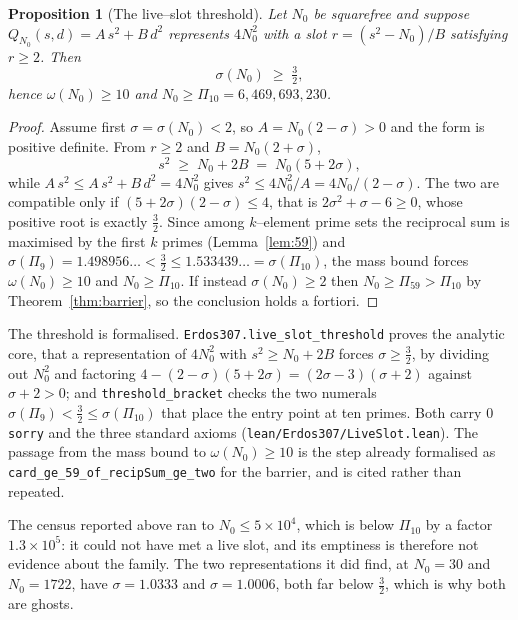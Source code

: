 \documentclass[11pt]{article}
\newtheorem{proposition}[theorem]{Proposition}
\theoremstyle{definition}
\begin{document}
\begin{proposition}[The live--slot threshold]\label{prop:liveslot}
Let $N_0$ be squarefree and suppose $Q_{N_0}(s,d)=A\,s^2+B\,d^2$ represents $4N_0^2$ with a slot
$r=(s^2-N_0)/B$ satisfying $r\ge2$. Then
\[ \sigma(N_0)\;\ge\;\tfrac32, \]
hence $\omega(N_0)\ge10$ and $N_0\ge\Pi_{10}=6{,}469{,}693{,}230$.
\end{proposition}
\begin{proof}
Assume first $\sigma=\sigma(N_0)<2$, so $A=N_0(2-\sigma)>0$ and the form is positive definite. From
$r\ge2$ and $B=N_0(2+\sigma)$,
\[ s^2\;\ge\;N_0+2B\;=\;N_0(5+2\sigma), \]
while $A\,s^2\le A\,s^2+B\,d^2=4N_0^2$ gives $s^2\le 4N_0^2/A=4N_0/(2-\sigma)$. The two are
compatible only if $(5+2\sigma)(2-\sigma)\le4$, that is $2\sigma^2+\sigma-6\ge0$, whose positive root
is exactly $\tfrac32$. Since among $k$--element prime sets the reciprocal sum is maximised by the
first $k$ primes (Lemma~\ref{lem:59}) and
$\sigma(\Pi_9)=1.498956\ldots<\tfrac32\le1.533439\ldots=\sigma(\Pi_{10})$, the mass bound forces
$\omega(N_0)\ge10$ and $N_0\ge\Pi_{10}$. If instead $\sigma(N_0)\ge2$ then $N_0\ge\Pi_{59}>\Pi_{10}$
by Theorem~\ref{thm:barrier}, so the conclusion holds a fortiori.
\end{proof}

The threshold is formalised. \texttt{Erdos307.live\_slot\_threshold} proves the analytic core, that
a representation of $4N_0^2$ with $s^2\ge N_0+2B$ forces $\sigma\ge\tfrac32$, by dividing out $N_0^2$
and factoring $4-(2-\sigma)(5+2\sigma)=(2\sigma-3)(\sigma+2)$ against $\sigma+2>0$; and
\texttt{threshold\_bracket} checks the two numerals
$\sigma(\Pi_9)<\tfrac32\le\sigma(\Pi_{10})$ that place the entry point at ten primes. Both carry $0$
\texttt{sorry} and the three standard axioms \textup{(\texttt{lean/Erdos307/LiveSlot.lean})}. The
passage from the mass bound to $\omega(N_0)\ge10$ is the step already formalised as
\texttt{card\_ge\_59\_of\_recipSum\_ge\_two} for the barrier, and is cited rather than repeated.

The census reported above ran to $N_0\le5\times10^4$, which is below $\Pi_{10}$ by a factor
$1.3\times10^5$: it could not have met a live slot, and its emptiness is therefore not evidence
about the family. The two representations it did find, at $N_0=30$ and $N_0=1722$, have
$\sigma=1.0333$ and $\sigma=1.0006$, both far below $\tfrac32$, which is why both are ghosts.
\end{document}
